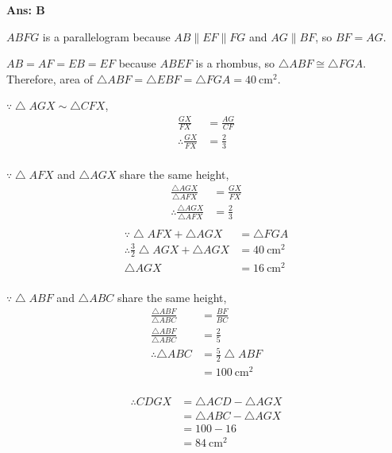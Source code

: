 \documentclass[border=3pt,varwidth=70mm]{standalone}
\begin{document}
\begin{answer}
\hrulefill\par
\textbf{Ans: B}

$ABFG$ is a parallelogram because $AB\parallel EF\parallel FG$ and $AG\parallel BF$, so $BF=AG$.

$AB=AF=EB=EF$ because $ABEF$ is a rhombus, so $\bigtriangleup ABF\cong\bigtriangleup FGA$. Therefore, area of $\bigtriangleup ABF = \bigtriangleup EBF = \bigtriangleup FGA = \SI{40}{\centi\meter\squared}$. 

$\because\bigtriangleup AGX\sim\bigtriangleup CFX$,
\begin{equation*}
\begin{aligned}
\frac{GX}{FX} &= \frac{AG}{CF} \\
\therefore \frac{GX}{FX} &= \frac{2}{3} \\ 
\end{aligned}
\end{equation*}

$\because\bigtriangleup AFX$ and $\bigtriangleup AGX$ share the same height,
\begin{equation*}
\begin{aligned}
\frac{\bigtriangleup AGX}{\bigtriangleup AFX} &= \frac{GX}{FX} \\
\therefore\frac{\bigtriangleup AGX}{\bigtriangleup AFX} &= \frac{2}{3} \\
\end{aligned}
\end{equation*}
\begin{equation*}
\begin{aligned}
\because\bigtriangleup AFX + \bigtriangleup AGX &= \bigtriangleup FGA\\
\therefore\frac{3}{2}\bigtriangleup AGX + \bigtriangleup AGX &= \SI{40}{\centi\meter\squared} \\
\bigtriangleup AGX &= \SI{16}{\centi\meter\squared} \\
\end{aligned}
\end{equation*}

$\because\bigtriangleup ABF$ and $\bigtriangleup ABC$ share the same height,
\begin{equation*}
\begin{aligned}
\frac{\bigtriangleup ABF}{\bigtriangleup ABC} &= \frac{BF}{BC} \\
\frac{\bigtriangleup ABF}{\bigtriangleup ABC} &= \frac{2}{5} \\
\therefore\bigtriangleup ABC &= \frac{5}{2}\bigtriangleup ABF \\
							&= \SI{100}{\centi\meter\squared} \\
\end{aligned}
\end{equation*}

\begin{equation*}
\begin{aligned}
\therefore CDGX &= \bigtriangleup ACD - \bigtriangleup AGX \\ 
				 &= \bigtriangleup ABC - \bigtriangleup AGX \\
				 &= 100 - 16 \\
				 &= \SI{84}{\centi\meter\squared} \\
\end{aligned}
\end{equation*}

\end{answer}
\end{document}

